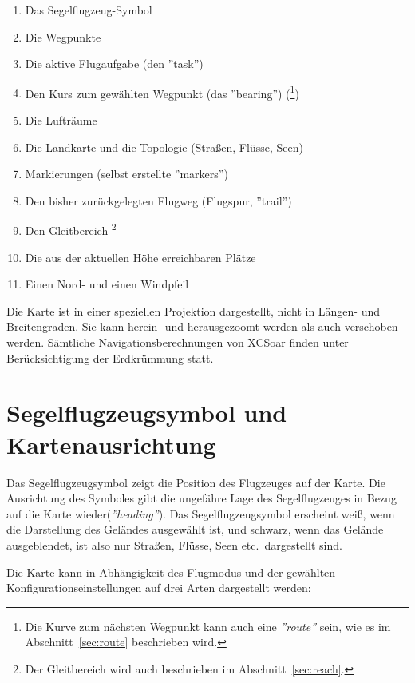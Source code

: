 \begin{enumerate}
  \item Das Segelflugzeug-Symbol
  \item Die Wegpunkte
  \item Die aktive Flugaufgabe (den ''task'')
  \item Den Kurs zum gewählten Wegpunkt (das ''bearing'')
     (\footnote{Die Kurve zum nächsten Wegpunkt kann auch eine {\em ''route''} sein, wie es im Abschnitt~\ref{sec:route} beschrieben wird.})
    \item Die Lufträume
  \item Die Landkarte und die Topologie (Straßen, Flüsse, Seen)
  \item Markierungen (selbst erstellte ''markers'')
  \item Den bisher zurückgelegten Flugweg (Flugspur, ''trail'')
  \item Den Gleitbereich \footnote{Der Gleitbereich wird auch beschrieben im Abschnitt~\ref{sec:reach}.}
  \item Die aus der aktuellen Höhe erreichbaren Plätze
  \item Einen Nord- und einen Windpfeil
\end{enumerate}

Die Karte ist in einer speziellen Projektion dargestellt, nicht in Längen- und Breitengraden. Sie kann herein- und herausgezoomt werden als auch verschoben werden. Sämtliche Navigationsberechnungen von \textsf{XCSoar} finden unter Berücksichtigung der Erdkrümmung statt.
\section{Segelflugzeugsymbol und Kartenausrichtung}\label{Segelflugzeugsymbol}

Das Segelflugzeugsymbol zeigt die Position des Flugzeuges auf der Karte. Die Ausrichtung des Symboles gibt die ungefähre Lage des Segelflugzeuges in Bezug auf die Karte wieder(\emph{''heading''}). Das Segelflugzeugsymbol erscheint weiß, wenn die Darstellung des Geländes ausgewählt ist, und schwarz, wenn das Gelände ausgeblendet, ist also nur Straßen, Flüsse, Seen etc.\ dargestellt sind.

Die Karte kann in Abhängigkeit des Flugmodus und der gewählten Konfigurationseinstellungen auf drei Arten dargestellt werden:

